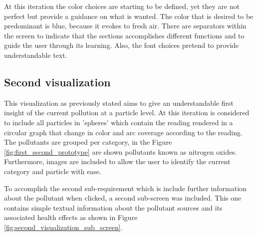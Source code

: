 At this iteration the color choices are starting to be defined, yet they are not perfect but provide a guidance on what is wanted. The color that is desired to be predominant is blue, because it evokes to fresh air. There are separators within the screen to indicate that the sections accomplishes different functions and to guide the user through its learning. Also, the font choices pretend to provide understandable text. 

\subsection{Second visualization}
This visualization as previously stated aims to give an understandable first insight of the current pollution at a particle level. At this iteration is considered to include all particles in 'spheres' which contain the reading rendered in a circular graph that change in color and arc coverage according to the reading. The pollutants are grouped per category, in the Figure \ref{fig:first_second_prototype} are shown pollutants known as nitrogen oxides. Furthermore, images are included to allow the user to identify the current category and particle with ease.

To accomplish the second sub-requirement which is include further information about the pollutant when clicked, a second sub-screen was included. This one contains simple textual information about the pollutant sources and its associated health effects as shown in Figure \ref{fig:second_visualization_sub_screen}. 

